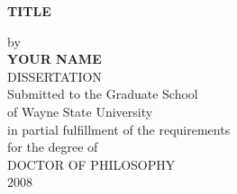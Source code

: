 \setcounter{page}{1} 
\thispagestyle{empty}
\begin{titlepage}


	\begin{center}

	\singlespacing
	\textbf{TITLE}\\
	\doublespacing
	
	by\\
	
	\textbf{YOUR NAME}\\
	DISSERTATION\\
	

	
	
	
	Submitted to the Graduate School\\
	
        of Wayne State University\\
	in partial fulfillment of the requirements\\
	for the degree of\\
	\vspace{0.8cm}
	DOCTOR OF PHILOSOPHY\\

	2008\\
	\end{center}
	\begin{flushright}
	\\
   \vspace{1.0cm}
	 \\
   \vspace{0.7cm}
	\makebox[8.7cm][l]{$\overline {\hspace{7.8cm}}$} \\
   \vspace{0.9cm}
	\makebox[8.7cm][l]{$\overline {\hspace{7.8cm}}$} \\
   \vspace{0.9cm}
	\makebox[8.7cm][l]{$\overline {\hspace{7.8cm}}$} \\
	
	\end{flushright}

	\end{titlepage}

